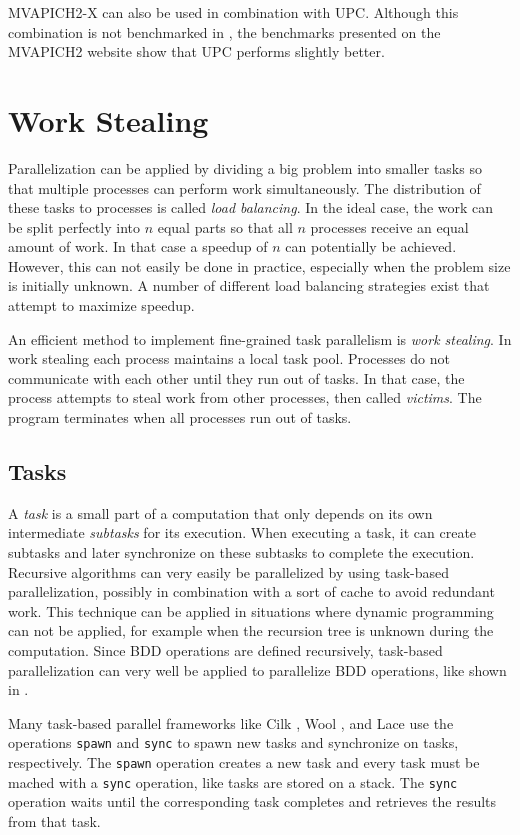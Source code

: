 MVAPICH2-X can also be used in combination with UPC. Although this combination is not benchmarked in \cite{openshmem_perf_evaluation}, the benchmarks presented on the MVAPICH2 website show that UPC performs slightly better.

\section{Work Stealing}
Parallelization can be applied by dividing a big problem into smaller tasks so that multiple processes can perform work simultaneously. The distribution of these tasks to processes is called \emph{load balancing}. In the ideal case, the work can be split perfectly into $n$ equal parts so that all $n$ processes receive an equal amount of work. In that case a speedup of $n$ can potentially be achieved. However, this can not easily be done in practice, especially when the problem size is initially unknown. A number of different load balancing strategies exist that attempt to maximize speedup.

An efficient method to implement fine-grained task parallelism is \emph{work stealing}. In work stealing each process maintains a local task pool. Processes do not communicate with each other until they run out of tasks. In that case, the process attempts to steal work from other processes, then called \emph{victims}. The program terminates when all processes run out of tasks.

\subsection{Tasks}
A \emph{task} is a small part of a computation that only depends on its own intermediate \emph{subtasks} for its execution. When executing a task, it can create subtasks and later synchronize on these subtasks to complete the execution. Recursive algorithms can very easily be parallelized by using task-based parallelization, possibly in combination with a sort of cache to avoid redundant work. This technique can be applied in situations where dynamic programming can not be applied, for example when the recursion tree is unknown during the computation. Since BDD operations are defined recursively, task-based parallelization can very well be applied to parallelize BDD operations, like shown in \cite{sylvan_multicore_bdd}.

Many task-based parallel frameworks like Cilk \cite{blumofe1996cilk}, Wool \cite{faxen2009wool}, and Lace \cite{lace} use the operations \texttt{spawn} and \texttt{sync} to spawn new tasks and synchronize on tasks, respectively. The \texttt{spawn} operation creates a new task and every task must be mached with a \texttt{sync} operation, like tasks are stored on a stack. The \texttt{sync} operation waits until the corresponding task completes and retrieves the results from that task. 

